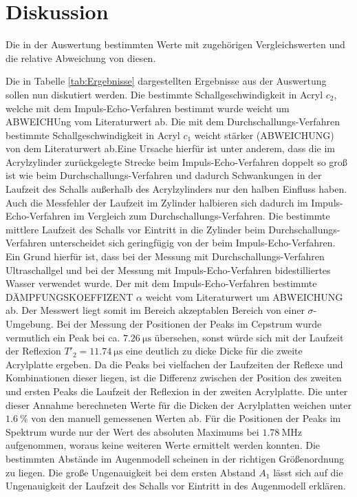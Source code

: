 
\section{Diskussion}
\label{sec:Diskussion}
\begin{table}
	\centering
	\caption{Die in der Auswertung bestimmten Werte mit zugehörigen Vergleichswerten und die relative Abweichung von diesen.}
	
\end{table}
Die in Tabelle \ref{tab:Ergebnisse} dargestellten Ergebnisse aus der Auswertung sollen nun diskutiert werden.
Die bestimmte Schallgeschwindigkeit in Acryl $c_2$, welche mit dem Impuls-Echo-Verfahren bestimmt wurde weicht um ABWEICHUng vom Literaturwert \cite{cAcryl} ab. Die mit dem Durchschallungs-Verfahren bestimmte Schallgeschwindigkeit in Acryl $c_1$ weicht stärker (ABWEICHUNG) von dem Literaturwert \cite{cAcryl} ab.Eine Ursache hierfür ist unter anderem, dass die im Acrylzylinder zurückgelegte Strecke beim Impuls-Echo-Verfahren doppelt so groß ist wie beim Durchschallungs-Verfahren und dadurch Schwankungen in der Laufzeit des Schalls außerhalb des Acrylzylinders nur den halben Einfluss haben. Auch die Messfehler der Laufzeit im Zylinder halbieren sich dadurch im Impuls-Echo-Verfahren im Vergleich zum Durchschallungs-Verfahren. Die bestimmte mittlere Laufzeit des Schalls vor Eintritt in die Zylinder beim Durchschallungs-Verfahren unterscheidet sich geringfügig von der beim Impuls-Echo-Verfahren. Ein Grund hierfür ist, dass bei der Messung mit Durchschallungs-Verfahren Ultraschallgel und bei der Messung mit Impuls-Echo-Verfahren bidestilliertes Wasser verwendet wurde. Der mit dem Impuls-Echo-Verfahren bestimmte DÄMPFUNGSKOEFFIZENT $\alpha$ weicht vom Literaturwert \cite{alphaAcryl} um ABWEICHUNG ab. Der Messwert liegt somit im Bereich akzeptablen Bereich von einer $\sigma$-Umgebung. Bei der Messung der Positionen der Peaks im Cepstrum wurde vermutlich ein Peak bei ca. $\SI{7.26}{\micro\second}$ übersehen, sonst würde sich mit der Laufzeit der Reflexion $T'_2=\SI{11.74}{\micro\second}$ eine deutlich zu dicke Dicke für die zweite Acrylplatte ergeben. Da die Peaks bei vielfachen der Laufzeiten der Reflexe und Kombinationen dieser liegen, ist die Differenz zwischen der Position des zweiten und ersten Peaks die Laufzeit der Reflexion in der zweiten Acrylplatte. Die unter dieser Annahme berechneten Werte für die Dicken der Acrylplatten weichen unter $\SI{1.6}{\percent}$ von den manuell gemessenen Werten ab. Für die Positionen der Peaks im Spektrum wurde nur der Wert des absoluten Maximums bei $\SI{1.78}{\mega\hertz}$ aufgenommen, woraus keine weiteren Werte ermittelt werden konnten. Die bestimmten Abstände im Augenmodell scheinen in der richtigen Größenordnung zu liegen. Die große Ungenauigkeit bei dem ersten Abstand $A_1$ lässt sich auf die Ungenauigkeit der Laufzeit des Schalls vor Eintritt in des Augenmodell erklären.
